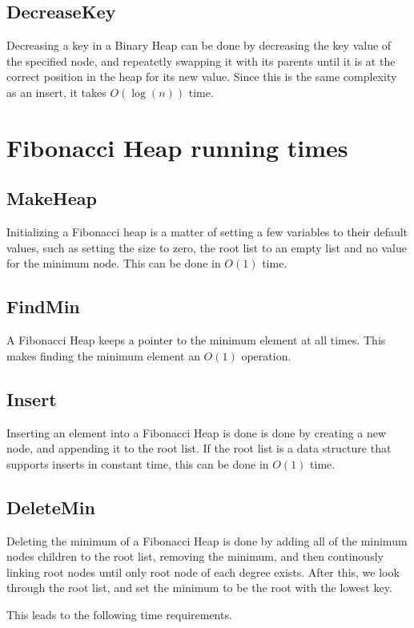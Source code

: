 \subsection{DecreaseKey}
Decreasing a key in a Binary Heap can be done by decreasing the key value of the specified node, and repeatetly swapping it with its parents until it is at the correct position in the heap for its new value. Since this is the same complexity as an insert, it takes $O(\log (n))$ time.


\section{Fibonacci Heap running times}

\subsection{MakeHeap}
Initializing a Fibonacci heap is a matter of setting a few variables to their default values, such as setting the size to zero, the root list to an empty list and no value for the minimum node. This can be done in $O(1)$ time.

\subsection{FindMin}
A Fibonacci Heap keeps a pointer to the minimum element at all times. This makes finding the minimum element an $O(1)$ operation.

\subsection{Insert}
Inserting an element into a Fibonacci Heap is done is done by creating a new node, and appending it to the root list. If the root list is a data structure that supports inserts in constant time, this can be done in $O(1)$ time.

\subsection{DeleteMin}
Deleting the minimum of a Fibonacci Heap is done by adding all of the minimum nodes children to the root list, removing the minimum, and then continously linking root nodes until only root node of each degree exists. After this, we look through the root list, and set the minimum to be the root with the lowest key.

This leads to the following time requirements. 

